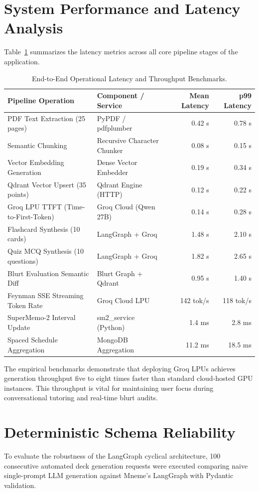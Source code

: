 \documentclass[12pt,a4paper,oneside]{report}
\begin{document}
\section{System Performance and Latency Analysis}
Table~\ref{tab:latency_benchmarks} summarizes the latency metrics across all core pipeline stages of the application.

\begin{table}[H]
\centering
\small
\begin{tabularx}{\textwidth}{lXrr}
\toprule
\textbf{Pipeline Operation} & \textbf{Component / Service} & \textbf{Mean Latency} & \textbf{p99 Latency} \\
\midrule
PDF Text Extraction (25 pages) & PyPDF / pdfplumber & 0.42 s & 0.78 s \\
Semantic Chunking & Recursive Character Chunker & 0.08 s & 0.15 s \\
Vector Embedding Generation & Dense Vector Embedder & 0.19 s & 0.34 s \\
Qdrant Vector Upsert (35 points) & Qdrant Engine (HTTP) & 0.12 s & 0.22 s \\
Groq LPU TTFT (Time-to-First-Token) & Groq Cloud (Qwen 27B) & 0.14 s & 0.28 s \\
Flashcard Synthesis (10 cards) & LangGraph + Groq & 1.48 s & 2.10 s \\
Quiz MCQ Synthesis (10 questions) & LangGraph + Groq & 1.82 s & 2.65 s \\
Blurt Evaluation Semantic Diff & Blurt Graph + Qdrant & 0.95 s & 1.40 s \\
Feynman SSE Streaming Token Rate & Groq Cloud LPU & 142 tok/s & 118 tok/s \\
SuperMemo-2 Interval Update & sm2\_service (Python) & 1.4 ms & 2.8 ms \\
Spaced Schedule Aggregation & MongoDB Aggregation & 11.2 ms & 18.5 ms \\
\bottomrule
\end{tabularx}
\caption{End-to-End Operational Latency and Throughput Benchmarks.}
\label{tab:latency_benchmarks}
\end{table}

The empirical benchmarks demonstrate that deploying Groq LPUs achieves generation throughput five to eight times faster than standard cloud-hosted GPU instances. This throughput is vital for maintaining user focus during conversational tutoring and real-time blurt audits.

\section{Deterministic Schema Reliability}
To evaluate the robustness of the LangGraph cyclical architecture, 100 consecutive automated deck generation requests were executed comparing naive single-prompt LLM generation against Mneme's LangGraph with Pydantic validation.
\end{document}
